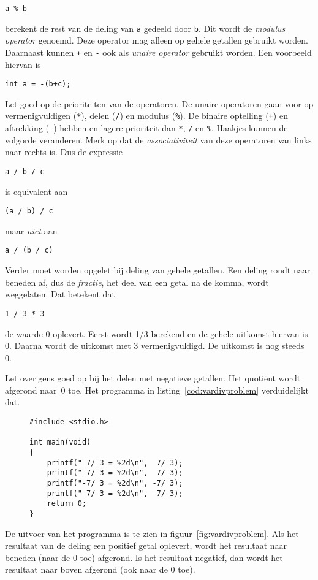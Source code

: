 \hspace*{1em}\texttt{a \% b}

berekent de rest van de deling van \texttt{a} gedeeld door \texttt{b}. Dit wordt de \textsl{modulus operator} genoemd. Deze operator mag alleen op gehele getallen gebruikt worden. Daarnaast kunnen \texttt{+} en \texttt{-} ook als \textsl{unaire operator} gebruikt worden. Een voorbeeld hiervan is

\hspace*{1em}\texttt{int a = -(b+c);}

Let goed op de prioriteiten van de operatoren. De unaire operatoren gaan voor op vermenigvuldigen (\texttt{*}), delen (\texttt{/}) en modulus (\texttt{\%}). De binaire optelling (\texttt{+}) en aftrekking (\texttt{-}) hebben en lagere prioriteit dan \texttt{*}, \texttt{/} en \texttt{\%}. Haakjes kunnen de volgorde veranderen. Merk op dat de \textsl{associativiteit} van deze operatoren van links naar rechts is. Dus de expressie

\hspace*{1em}\texttt{a / b / c}

is equivalent aan

\hspace*{1em}\texttt{(a / b) / c}
 
maar \textsl{niet} aan

\hspace*{1em}\texttt{a / (b / c)}

Verder moet worden opgelet bij deling van gehele getallen. Een deling rondt naar beneden af, dus de \textsl{fractie}, het deel van een getal na de komma, wordt weggelaten. Dat betekent dat

\hspace*{1em}\texttt{1 / 3 * 3}

de waarde 0 oplevert. Eerst wordt 1/3 berekend en de gehele uitkomst hiervan is 0. Daarna wordt de uitkomst met 3 vermenigvuldigd. De uitkomst is nog steeds 0.

Let overigens goed op bij het delen met negatieve getallen. Het quotiënt wordt afgerond naar~0 toe. Het programma in listing~\ref{cod:vardivproblem} verduidelijkt dat.
%
\begin{figure}[!ht]
\begin{lstlisting}[caption=Delen van positieve en negatieve getallen.,label=cod:vardivproblem]
#include <stdio.h>

int main(void)
{
	printf(" 7/ 3 = %2d\n",  7/ 3);
	printf(" 7/-3 = %2d\n",  7/-3);
	printf("-7/ 3 = %2d\n", -7/ 3);
	printf("-7/-3 = %2d\n", -7/-3);
	return 0;
}
\end{lstlisting}
\end{figure}
%
De uitvoer van het programma is te zien in figuur~\ref{fig:vardivproblem}.
Als het resultaat van de deling een positief getal oplevert, wordt het resultaat naar beneden (naar de 0 toe) afgerond. Is het resultaat negatief, dan wordt het resultaat naar boven afgerond (ook naar de 0 toe).

